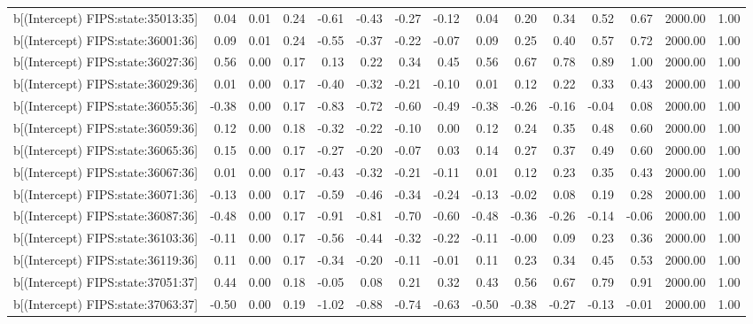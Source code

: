 \begin{table}[ht]
\begin{tabular}{rrrrrrrrrrrrrrr}
  b[(Intercept) FIPS:state:35013:35] & 0.04 & 0.01 & 0.24 & -0.61 & -0.43 & -0.27 & -0.12 & 0.04 & 0.20 & 0.34 & 0.52 & 0.67 & 2000.00 & 1.00 \\ 
  b[(Intercept) FIPS:state:36001:36] & 0.09 & 0.01 & 0.24 & -0.55 & -0.37 & -0.22 & -0.07 & 0.09 & 0.25 & 0.40 & 0.57 & 0.72 & 2000.00 & 1.00 \\ 
  b[(Intercept) FIPS:state:36027:36] & 0.56 & 0.00 & 0.17 & 0.13 & 0.22 & 0.34 & 0.45 & 0.56 & 0.67 & 0.78 & 0.89 & 1.00 & 2000.00 & 1.00 \\ 
  b[(Intercept) FIPS:state:36029:36] & 0.01 & 0.00 & 0.17 & -0.40 & -0.32 & -0.21 & -0.10 & 0.01 & 0.12 & 0.22 & 0.33 & 0.43 & 2000.00 & 1.00 \\ 
  b[(Intercept) FIPS:state:36055:36] & -0.38 & 0.00 & 0.17 & -0.83 & -0.72 & -0.60 & -0.49 & -0.38 & -0.26 & -0.16 & -0.04 & 0.08 & 2000.00 & 1.00 \\ 
  b[(Intercept) FIPS:state:36059:36] & 0.12 & 0.00 & 0.18 & -0.32 & -0.22 & -0.10 & 0.00 & 0.12 & 0.24 & 0.35 & 0.48 & 0.60 & 2000.00 & 1.00 \\ 
  b[(Intercept) FIPS:state:36065:36] & 0.15 & 0.00 & 0.17 & -0.27 & -0.20 & -0.07 & 0.03 & 0.14 & 0.27 & 0.37 & 0.49 & 0.60 & 2000.00 & 1.00 \\ 
  b[(Intercept) FIPS:state:36067:36] & 0.01 & 0.00 & 0.17 & -0.43 & -0.32 & -0.21 & -0.11 & 0.01 & 0.12 & 0.23 & 0.35 & 0.43 & 2000.00 & 1.00 \\ 
  b[(Intercept) FIPS:state:36071:36] & -0.13 & 0.00 & 0.17 & -0.59 & -0.46 & -0.34 & -0.24 & -0.13 & -0.02 & 0.08 & 0.19 & 0.28 & 2000.00 & 1.00 \\ 
  b[(Intercept) FIPS:state:36087:36] & -0.48 & 0.00 & 0.17 & -0.91 & -0.81 & -0.70 & -0.60 & -0.48 & -0.36 & -0.26 & -0.14 & -0.06 & 2000.00 & 1.00 \\ 
  b[(Intercept) FIPS:state:36103:36] & -0.11 & 0.00 & 0.17 & -0.56 & -0.44 & -0.32 & -0.22 & -0.11 & -0.00 & 0.09 & 0.23 & 0.36 & 2000.00 & 1.00 \\ 
  b[(Intercept) FIPS:state:36119:36] & 0.11 & 0.00 & 0.17 & -0.34 & -0.20 & -0.11 & -0.01 & 0.11 & 0.23 & 0.34 & 0.45 & 0.53 & 2000.00 & 1.00 \\ 
  b[(Intercept) FIPS:state:37051:37] & 0.44 & 0.00 & 0.18 & -0.05 & 0.08 & 0.21 & 0.32 & 0.43 & 0.56 & 0.67 & 0.79 & 0.91 & 2000.00 & 1.00 \\ 
  b[(Intercept) FIPS:state:37063:37] & -0.50 & 0.00 & 0.19 & -1.02 & -0.88 & -0.74 & -0.63 & -0.50 & -0.38 & -0.27 & -0.13 & -0.01 & 2000.00 & 1.00 \\ 

\end{tabular}
\end{table}
